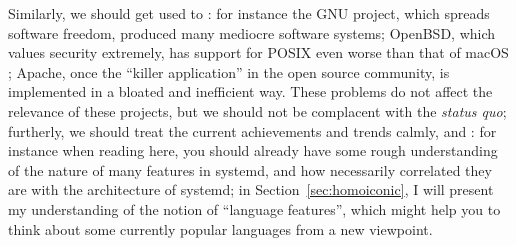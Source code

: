 Similarly, we should get used to : for instance the GNU project, which spreads software freedom,
produced many mediocre software systems; OpenBSD, which
values security extremely, has support for POSIX even worse than that of macOS%
; Apache, once the ``killer application'' in the open
source community, is implemented in a bloated and inefficient way.  These
problems do not affect the relevance of these projects, but we should not be
complacent with the \emph{status quo}; furtherly, we should treat the current
achievements and trends calmly, and : for instance when reading here, you should already have
some rough understanding of the nature of many features in systemd, and
how necessarily correlated they are with the architecture of systemd;
in Section~\ref{sec:homoiconic}, I will present my understanding
of the notion of ``language features'', which might help you to
think about some currently popular languages from a new viewpoint.

